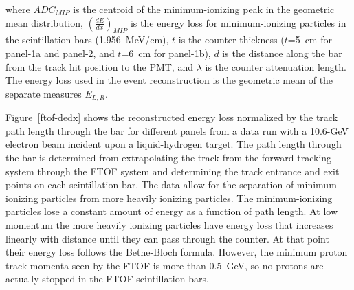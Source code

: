 \documentclass[final,3p,twocolumn]{elsarticle}
\begin{document}
\noindent
where $ADC_{MIP}$ is the centroid of the minimum-ionizing peak in the geometric mean distribution,
$\left( \frac{dE}{dx} \right)_{MIP}$ is the energy loss for minimum-ionizing particles in the scintillation
bars (1.956~MeV/cm), $t$ is the counter thickness ($t$=5~cm for panel-1a and panel-2, and $t$=6~cm
for panel-1b), $d$ is the distance along the bar from the track hit position to the PMT, and $\lambda$ is
the counter attenuation length. The energy loss used in the event reconstruction is the geometric mean of
the separate measures $E_{L,R}$.

Figure~\ref{ftof-dedx} shows the reconstructed energy loss normalized by the track path length through
the bar for different panels from a data run with a 10.6-GeV electron beam incident upon a liquid-hydrogen
target. The path length through the bar is determined from extrapolating the track from the forward
tracking system through the FTOF system and determining the track entrance and exit points on each
scintillation bar. The data allow for the separation of minimum-ionizing particles from more heavily ionizing
particles. The minimum-ionizing particles lose a constant amount of energy as a function of path length. At
low momentum the more heavily ionizing particles have energy loss that increases linearly with distance until
they can pass through the counter. At that point their energy loss follows the Bethe-Bloch formula. However,
the minimum proton track momenta seen by the FTOF is more than 0.5~GeV, so no protons are actually stopped
in the FTOF scintillation bars.
\end{document}
